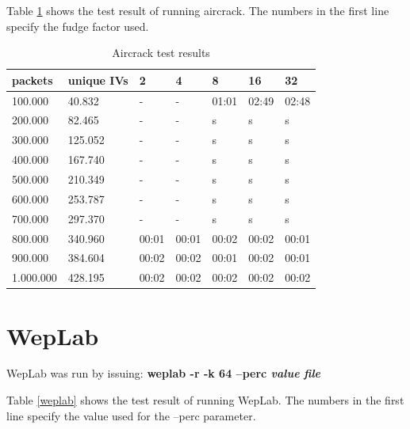 \begin{appendix}
Table \ref{aircrack} shows the test result of running aircrack. The numbers in the first line specify the fudge factor used.

\begin{table}[htbp]
	\begin{center}
		\begin{tabular}{|l|l|l|l|l|l|l|}
		\hline
		\bf{packets}&\bf{unique IVs} &\bf{2} &\bf{4} &\bf{8} &\bf{16} &\bf{32}\\
		\hline
		100.000&40.832&-&-&01:01&02:49&02:48\\
		\hline
		200.000&82.465&-&-&s&s&s\\
		\hline
		300.000&125.052&-&-&s&s&s\\
		\hline
		400.000&167.740&-&-&s&s&s\\
		\hline
		500.000&210.349&-&-&s&s&s\\
		\hline
		600.000&253.787&-&-&s&s&s\\
		\hline
		700.000&297.370&-&-&s&s&s\\
		\hline
		800.000&340.960&00:01&00:01&00:02&00:02&00:01\\
		\hline
		900.000&384.604&00:02&00:02&00:01&00:02&00:01\\
		\hline
		1.000.000&428.195&00:02&00:02&00:02&00:02&00:02\\
		\hline
		\end{tabular}
	\end{center}
	\vspace{-1em}
	\caption{Aircrack test results}
	\label{aircrack}
\end{table}

\section{WepLab}

WepLab was run by issuing: {\bf weplab -r -k 64 --perc {\em value} {\em file}}

Table \ref{weplab} shows the test result of running WepLab. The numbers in the first line specify the value used for the --perc parameter.


\end{appendix}
